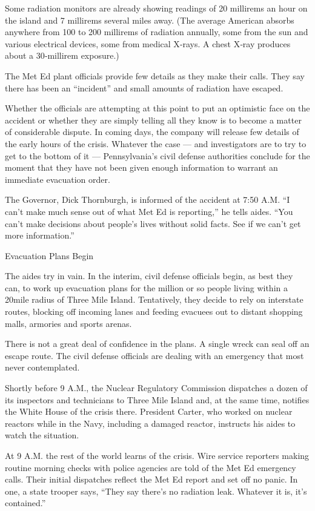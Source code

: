 Some radiation monitors are already showing readings of 20 millirems an
hour on the island and 7 millirems several miles away. (The average
American absorbs anywhere from 100 to 200 millirems of radiation
annually, some from the sun and various electrical devices, some from
medical X‐rays. A chest X‐ray produces about a 30‐millirem exposure.)

The Met Ed plant officials provide few details as they make their calls.
They say there has been an ``incident'' and small amounts of radiation
have escaped.

Whether the officials are attempting at this point to put an optimistic
face on the accident or whether they are simply telling all they know is
to become a matter of considerable dispute. In coming days, the company
will release few details of the early hours of the crisis. Whatever the
case --- and investigators are to try to get to the bottom of it ---
Pennsylvania's civil defense authorities conclude for the moment that
they have not been given enough information to warrant an immediate
evacuation order.

The Governor, Dick Thornburgh, is informed of the accident at 7:50 A.M.
``I can't make much sense out of what Met Ed is reporting,'' he tells
aides. ``You can't make decisions about people's lives without solid
facts. See if we can't get more information.''

Evacuation Plans Begin

The aides try in vain. In the interim, civil defense officials begin, as
best they can, to work up evacuation plans for the million or so people
living within a 20mile radius of Three Mile Island. Tentatively, they
decide to rely on interstate routes, blocking off incoming lanes and
feeding evacuees out to distant shopping malls, armories and sports
arenas.

There is not a great deal of confidence in the plans. A single wreck can
seal off an escape route. The civil defense officials are dealing with
an emergency that most never contemplated.

Shortly before 9 A.M., the Nuclear Regulatory Commission dispatches a
dozen of its inspectors and technicians to Three Mile Island and, at the
same time, notifies the White House of the crisis there. President
Carter, who worked on nuclear reactors while in the Navy, including a
damaged reactor, instructs his aides to watch the situation.

At 9 A.M. the rest of the world learns of the crisis. Wire service
reporters making routine morning checks with police agencies are told of
the Met Ed emergency calls. Their initial dispatches reflect the Met Ed
report and set off no panic. In one, a state trooper says, ``They say
there's no radiation leak. Whatever it is, it's contained.''

